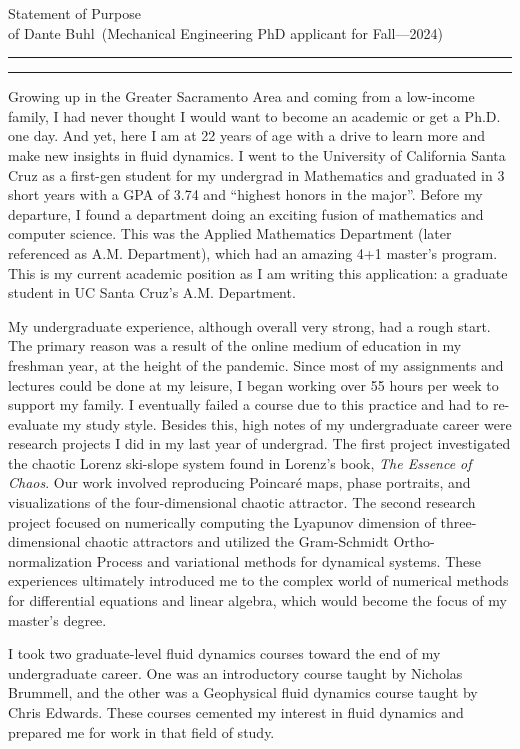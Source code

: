 \documentclass{article}
\newcommand{\soptitle}{Statement of Purpose}
\newcommand{\yourname}{Dante Buhl}
\begin{document}
\begin{center}\LARGE\soptitle\\
\large of \yourname\ (Mechanical Engineering PhD applicant for Fall---2024)
\end{center}

\hrule
\vspace{1pt}
\hrule height 1pt

\bigskip

\large
Growing up in the Greater Sacramento Area and coming from a low-income family, I had never thought I would want to become an academic or get a Ph.D. one day. And yet, here I am at 22 years of age with a drive to learn more and make new insights in fluid dynamics. I went to the University of California Santa Cruz as a first-gen student for my undergrad in Mathematics and graduated in 3 short years with a GPA of 3.74 and ``highest honors in the major''. Before my departure, I found a department doing an exciting fusion of mathematics and computer science. This was the Applied Mathematics Department (later referenced as A.M. Department), which had an amazing 4+1 master's program. This is my current academic position as I am writing this application: a graduate student in UC Santa Cruz's A.M. Department. 

My undergraduate experience, although overall very strong, had a rough start. The primary reason was a result of the online medium of education in my freshman year, at the height of the pandemic. Since most of my assignments and lectures could be done at my leisure, I began working over 55 hours per week to support my family. I eventually failed a course due to this practice and had to re-evaluate my study style. Besides this, high notes of my undergraduate career were research projects I did in my last year of undergrad. The first project investigated the chaotic Lorenz ski-slope system found in Lorenz's book, \textit{The Essence of Chaos}. Our work involved reproducing Poincar\'e maps, phase portraits, and visualizations of the four-dimensional chaotic attractor. The second research project focused on numerically computing the Lyapunov dimension of three-dimensional chaotic attractors and utilized the Gram-Schmidt Ortho-normalization Process and variational methods for dynamical systems. These experiences ultimately introduced me to the complex world of numerical methods for differential equations and linear algebra, which would become the focus of my master's degree. 

I took two graduate-level fluid dynamics courses toward the end of my undergraduate career. One was an introductory course taught by Nicholas Brummell, and the other was a Geophysical fluid dynamics course taught by Chris Edwards. These courses cemented my interest in fluid dynamics and prepared me for work in that field of study. 
\end{document}
